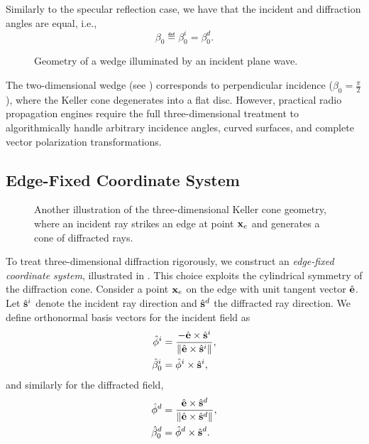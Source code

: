Similarly to the specular reflection case, we have that the incident and diffraction angles are equal, i.e.,
\begin{equation}
  \beta_0 \eqdef \beta_0^i = \beta_0^d.
\end{equation}

\begin{figure}
  \centering
  \caption{Geometry of a wedge illuminated by an incident plane wave.}
\end{figure}

The two-dimensional wedge (see ) corresponds to perpendicular incidence ($\beta_0 = \tfrac{\pi}{2}$), where the Keller cone degenerates into a flat disc. However, practical radio propagation engines require the full three-dimensional treatment to algorithmically handle arbitrary incidence angles, curved surfaces, and complete vector polarization transformations.

\subsection{Edge-Fixed Coordinate System}

\begin{figure}
  \centering
  \caption{Another illustration of the three-dimensional Keller cone geometry, where an incident ray strikes an edge at point $\mathbf{x}_e$ and generates a cone of diffracted rays.}
\end{figure}

To treat three-dimensional diffraction rigorously, we construct an \emph{edge-fixed coordinate system}, illustrated in . This choice exploits the cylindrical symmetry of the diffraction cone. Consider a point $\mathbf{x}_e$ on the edge with unit tangent vector $\hat{\mathbf{e}}$. Let $\hat{\mathbf{s}}^i$ denote the incident ray direction and $\hat{\mathbf{s}}^d$ the diffracted ray direction. We define orthonormal basis vectors for the incident field as
\begin{align}
  \hat{\mathbf{\phi}}^i &= \frac{-\hat{\mathbf{e}} \times \hat{\mathbf{s}}^i}{\|\hat{\mathbf{e}} \times \hat{\mathbf{s}}^i\|}, \\
  \hat{\mathbf{\beta}}_0^i &= \hat{\mathbf{\phi}}^i \times \hat{\mathbf{s}}^i,
\end{align}
and similarly for the diffracted field,
\begin{align}
  \hat{\mathbf{\phi}}^d &= \frac{\hat{\mathbf{e}} \times \hat{\mathbf{s}}^d}{\|\hat{\mathbf{e}} \times \hat{\mathbf{s}}^d\|}, \\
  \hat{\mathbf{\beta}}_0^d &= \hat{\mathbf{\phi}}^d \times \hat{\mathbf{s}}^d.
\end{align}

